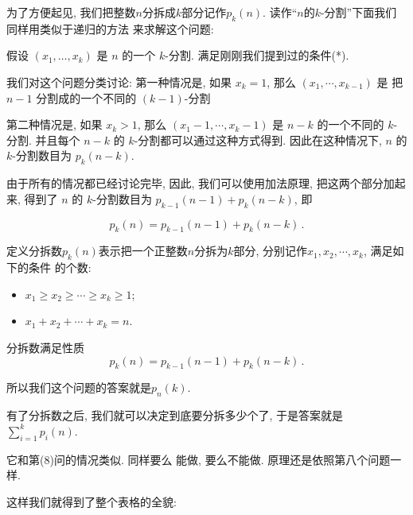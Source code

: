为了方便起见, 我们把整数$n$分拆成$k$部分记作$p_k(n)$. 读作``$n$的$k$-分割''下面我们同样用类似于递归的方法
来求解这个问题: 

假设 \((x_1,\ldots,x_k)\) 是 \(n\) 的一个 \(k\)-分割. 满足刚刚我们提到过的条件(*).

我们对这个问题分类讨论: 第一种情况是, 如果 \(x_k = 1\),
那么 \((x_1,\cdots,x_{k-1})\) 是 把\(n-1\) 分割成的一个不同的 \((k-1)\)-分割

第二种情况是, 如果 \(x_k > 1\), 那么 \((x_1-1,\cdots,x_{k}-1)\) 是 \(n-k\) 
的一个不同的 \(k\)-分割. 并且每个 \(n-k\) 的 \(k\)-分割都可以通过这种方式得到. 
因此在这种情况下, \(n\) 的 \(k\)-分割数目为 \(p_k(n-k)\). 

由于所有的情况都已经讨论完毕, 因此, 我们可以使用加法原理, 把这两个部分加起来, 得到了
\(n\) 的 \(k\)-分割数目为 \(p_{k-1}(n-1) + p_k(n-k)\), 即

\[p_k(n)=p_{k-1}(n-1)+p_k(n-k)\,.\]

\begin{definition}[分拆数]
  定义分拆数$p_k(n)$表示把一个正整数$n$分拆为$k$部分, 分别记作$x_1, x_2, \cdots, x_k$, 满足如下的条件
  的个数: 
  \begin{itemize}[noitemsep]
    \item  $x_1\ge x_2\ge\cdots\ge x_k\ge 1$;
    \item $x_1+x_2+\cdots+x_k=n$.
  \end{itemize}
\end{definition}

\begin{theorem}
  分拆数满足性质
  $$p_k(n)=p_{k-1}(n-1)+p_k(n-k)\,.$$
\end{theorem}

所以我们这个问题的答案就是$p_n(k)$. 

有了分拆数之后, 我们就可以决定到底要分拆多少个了,  于是答案就是$\sum_{i=1}^{k}p_i(n)$. 

 它和第(8)问的情况类似. 同样要么
能做, 要么不能做. 原理还是依照第八个问题一样. 

这样我们就得到了整个表格的全貌: 

